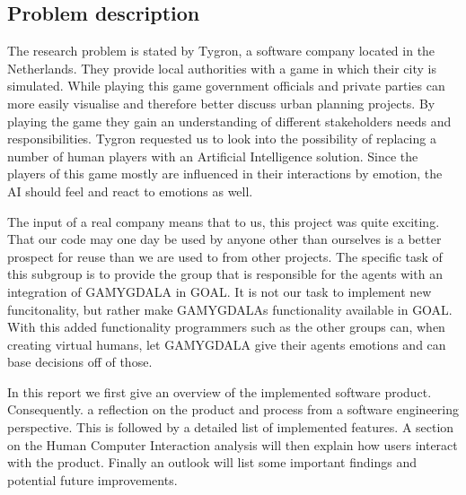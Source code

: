 \documentclass[11pt]{article}
\begin{document}
\subsection{Problem description}
The research problem is stated by Tygron\cite{Tygron}, a software company located in the Netherlands. They provide local authorities with a game in which their city is simulated. While playing this game government officials and private parties can more easily visualise and therefore better discuss urban planning projects. By playing the game they gain an understanding of different stakeholders needs and responsibilities. Tygron requested us to look into the possibility of replacing a number of human players with an Artificial Intelligence solution. Since the players of this game mostly are influenced in their interactions by emotion, the AI should feel and react to emotions as well.\par 
The input of a real company means that to us, this project was quite exciting. That our code may one day be used by anyone other than ourselves is a better prospect for reuse than we are used to from other projects. The specific task of this subgroup is to provide the group that is responsible for the agents with an integration of GAMYGDALA in GOAL. It is not our task to implement new funcitonality, but rather make GAMYGDALAs functionality available in GOAL.  With this added functionality programmers such as the other groups can, when creating virtual humans, let GAMYGDALA give their agents emotions and can base decisions off of those.\par 
In this report we first give an overview of the implemented software product. Consequently. a reflection on the product and process from a software engineering perspective. This is followed by a detailed list of implemented features. A section on the Human Computer Interaction analysis will then explain how users interact with the product. Finally an outlook will list some important findings and potential future improvements.
\end{document}
